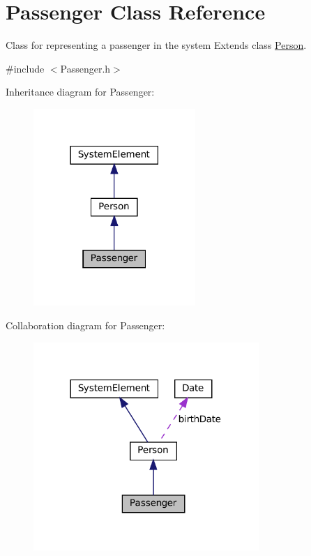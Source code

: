 \hypertarget{classPassenger}{}\section{Passenger Class Reference}
\label{classPassenger}


Class for representing a passenger in the system Extends class \mbox{\hyperlink{classPerson}{Person}}.  




{\ttfamily \#include $<$Passenger.\+h$>$}



Inheritance diagram for Passenger\+:
\nopagebreak
\begin{figure}[H]
\begin{center}
\leavevmode
\includegraphics[width=174pt]{classPassenger__inherit__graph}
\end{center}
\end{figure}


Collaboration diagram for Passenger\+:
\nopagebreak
\begin{figure}[H]
\begin{center}
\leavevmode
\includegraphics[width=242pt]{classPassenger__coll__graph}
\end{center}
\end{figure}
